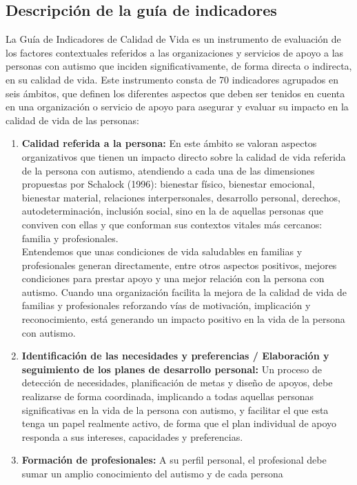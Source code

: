 \subsection{Descripción de la guía de indicadores}
La Guía de Indicadores de Calidad de Vida es un instrumento de evaluación de los
factores contextuales referidos a las organizaciones y servicios de apoyo a las
personas con autismo que inciden significativamente, de forma directa o
indirecta, en su calidad de vida. Este instrumento consta de 70 indicadores
agrupados en seis ámbitos, que definen los diferentes aspectos que deben ser
tenidos en cuenta en una organización o servicio de apoyo para asegurar y
evaluar su impacto en la calidad de vida de las personas: 
\begin{enumerate}
	\item \textbf{Calidad referida a la persona: }En este ámbito se valoran
	aspectos organizativos que tienen un impacto directo sobre la calidad de
	vida referida de la persona con autismo, atendiendo a cada una de las
	dimensiones propuestas por Schalock (1996): bienestar físico, bienestar
	emocional, bienestar material, relaciones interpersonales, desarrollo
	personal, derechos, autodeterminación, inclusión social, sino en la de
	aquellas personas que conviven con ellas y que conforman sus contextos
	vitales más cercanos: familia y profesionales.
	\\
	Entendemos que unas condiciones de vida saludables en familias y
	profesionales generan directamente, entre otros aspectos positivos, mejores
	condiciones para prestar apoyo y una mejor relación con la persona con
	autismo. Cuando una organización facilita la mejora de la calidad de vida de
	familias y profesionales reforzando vías de motivación, implicación y
	reconocimiento, está generando un impacto positivo en la vida de la persona
	con autismo.
	\item \textbf{Identificación de las necesidades y preferencias / Elaboración
	y seguimiento de los planes de desarrollo personal: }Un proceso de detección
	de necesidades, planificación de metas y diseño de apoyos, debe realizarse
	de forma coordinada, implicando a todas aquellas personas significativas en
	la vida de la persona con autismo, y facilitar el que esta tenga un papel
	realmente activo, de forma que el plan individual de apoyo responda a sus
	intereses, capacidades y preferencias. 
	\item \textbf{Formación de profesionales: }A su perfil personal, el
	profesional debe sumar un amplio conocimiento del autismo y de cada persona

\end{enumerate}
